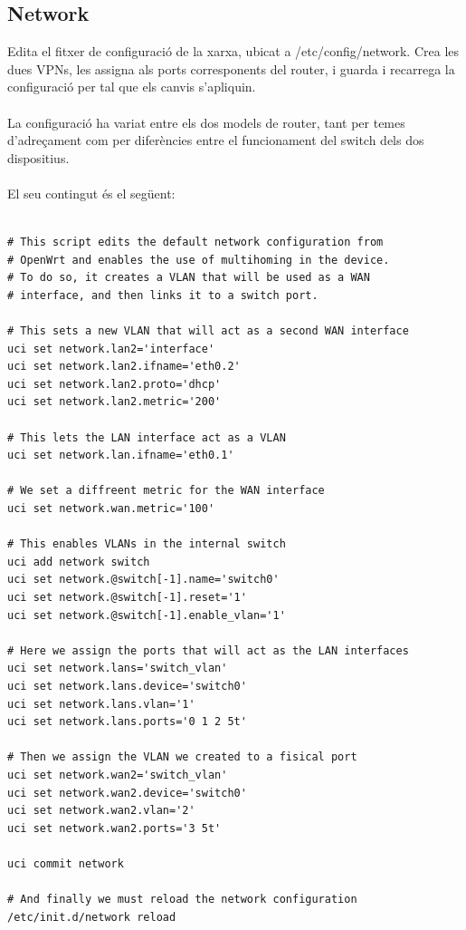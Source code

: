 \documentclass[11pt]{article}
\begin{document}
\subsection{Network}
Edita el fitxer de configuració de la xarxa, ubicat a /etc/config/network. Crea les dues VPNs, les assigna als ports corresponents del router, i guarda i recarrega la configuració per tal que els canvis s’apliquin.\\
\\
La configuració ha variat entre els dos models de router, tant per temes d'adreçament com per diferències entre el funcionament del switch dels dos dispositius.\\
\\
El seu contingut és el següent:\\
\lstset{caption=Script de configuració de la xarxa: WNDR3800}
\begin{lstlisting}[frame=single]

# This script edits the default network configuration from 
# OpenWrt and enables the use of multihoming in the device.
# To do so, it creates a VLAN that will be used as a WAN 
# interface, and then links it to a switch port.

# This sets a new VLAN that will act as a second WAN interface
uci set network.lan2='interface'
uci set network.lan2.ifname='eth0.2'
uci set network.lan2.proto='dhcp'
uci set network.lan2.metric='200'

# This lets the LAN interface act as a VLAN
uci set network.lan.ifname='eth0.1'

# We set a diffreent metric for the WAN interface
uci set network.wan.metric='100'

# This enables VLANs in the internal switch
uci add network switch
uci set network.@switch[-1].name='switch0'
uci set network.@switch[-1].reset='1'
uci set network.@switch[-1].enable_vlan='1'

# Here we assign the ports that will act as the LAN interfaces
uci set network.lans='switch_vlan'
uci set network.lans.device='switch0'
uci set network.lans.vlan='1'
uci set network.lans.ports='0 1 2 5t'

# Then we assign the VLAN we created to a fisical port
uci set network.wan2='switch_vlan'
uci set network.wan2.device='switch0'
uci set network.wan2.vlan='2'
uci set network.wan2.ports='3 5t'

uci commit network

# And finally we must reload the network configuration
/etc/init.d/network reload
\end{lstlisting}
\end{document}
